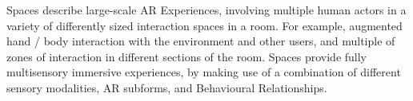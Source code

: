 Spaces describe large-scale AR Experiences, involving multiple human actors in a variety of differently sized interaction spaces in a room. For example, augmented hand / body interaction with the environment and other users, and multiple of zones of interaction in different sections of the room. Spaces provide fully multisensory immersive experiences, by making use of a combination of different sensory modalities, AR subforms, and Behavioural Relationships.



